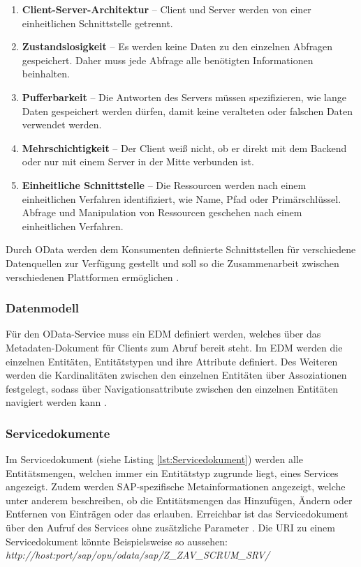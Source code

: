 	\begin{enumerate}
	\item \textbf{Client-Server-Architektur} --
	Client und Server werden von einer einheitlichen Schnittstelle getrennt.
	\item \textbf{Zustandslosigkeit} --
	Es werden keine Daten zu den einzelnen Abfragen gespeichert. Daher muss jede Abfrage alle benötigten Informationen beinhalten.
	\item \textbf{Pufferbarkeit} --
	Die Antworten des Servers müssen spezifizieren, wie lange Daten gespeichert werden dürfen, damit keine veralteten oder falschen Daten verwendet werden.
	\item \textbf{Mehrschichtigkeit} --
	Der Client weiß nicht, ob er direkt mit dem Backend oder nur mit einem Server in der Mitte verbunden ist.
	\item \textbf{Einheitliche Schnittstelle} -- Die Ressourcen werden nach einem einheitlichen Verfahren identifiziert, wie \zB Name, Pfad oder Primärschlüssel. Abfrage und Manipulation von Ressourcen geschehen nach einem einheitlichen Verfahren.
	\end{enumerate}
Durch OData werden dem Konsumenten definierte Schnittstellen für verschiedene Datenquellen zur Verfügung gestellt und soll so die Zusammenarbeit zwischen verschiedenen Plattformen ermöglichen \cite[S.\ 69-70]{BoennenDreesFischerHeinzStrothmann2014}.

\subsubsection{Datenmodell}
Für den OData-Service muss ein \ac{EDM} definiert werden, welches über das Metadaten-Dokument für Clients zum Abruf  bereit steht. Im \ac{EDM} werden die einzelnen Entitäten, Entitätstypen und ihre Attribute definiert. Des Weiteren werden die Kardinalitäten zwischen den einzelnen Entitäten über Assoziationen festgelegt, sodass über Navigationsattribute zwischen den einzelnen Entitäten navigiert werden kann \cite[S.\ 72-73]{BoennenDreesFischerHeinzStrothmann2014}.


\subsubsection{Servicedokumente}

Im Servicedokument (siehe Listing \ref{lst:Servicedokument}) werden alle Entitätsmengen, welchen immer ein Entitätstyp zugrunde liegt, eines Services angezeigt. Zudem werden SAP-spezifische Metainformationen angezeigt, welche unter anderem beschreiben, ob die Entitätsmengen das Hinzufügen, Ändern oder Entfernen von Einträgen oder das erlauben. Erreichbar ist das Servicedokument über den Aufruf des Services ohne zusätzliche Parameter \cite[S.\ 77-81]{BoennenDreesFischerHeinzStrothmann2014}. Die URI zu einem Servicedokument könnte Beispielsweise so aussehen: \\\textit{http://host:port/sap/opu/odata/sap/Z\_ZAV\_SCRUM\_SRV/}\\


